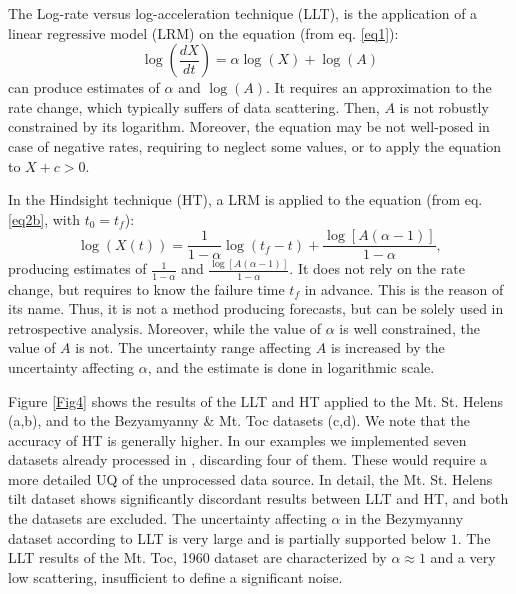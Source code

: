 \documentclass{article}
\begin{document}
The Log-rate versus log-acceleration technique (LLT), is the application of a linear regressive model (LRM) on the equation (from eq. \ref{eq1}):
$$\log\left(\frac{dX}{dt}\right)=\alpha\log(X)+\log(A)$$
can produce estimates of $\alpha$ and $\log(A)$. It requires an approximation to the rate change, which typically suffers of data scattering. Then, $A$ is not robustly constrained by its logarithm. Moreover, the equation may be not well-posed in case of negative rates, requiring to neglect some values, or to apply the equation to $X+c > 0$.

In the Hindsight technique (HT), a LRM is applied to the equation (from eq. \ref{eq2b}, with $t_0=t_f$):
$$\log(X(t))=\frac{1}{1-\alpha}\log(t_f-t)+\frac{\log[A(\alpha-1)]}{1-\alpha},$$
producing estimates of $\frac{1}{1-\alpha}$ and $\frac{\log[A(\alpha-1)]}{1-\alpha}$. It does not rely on the rate change, but requires to know the failure time $t_f$ in advance. This is the reason of its name. Thus, it is not a method producing forecasts, but can be solely used in retrospective analysis. Moreover, while the value of $\alpha$ is well constrained, the value of $A$ is not. The uncertainty range affecting $A$ is increased by the uncertainty affecting $\alpha$, and the estimate is done in logarithmic scale.

Figure \ref{Fig4} shows the results of the LLT and HT applied to the Mt. St. Helens (a,b), and to the Bezyamyanny \& Mt. Toc datasets (c,d). We note that the accuracy of HT is generally higher. In our examples we implemented seven datasets already processed in \cite{Voight1988}, discarding four of them. These would require a more detailed UQ of the unprocessed data source. In detail, the Mt. St. Helens tilt dataset shows significantly discordant results between LLT and HT, and both the datasets are excluded. The uncertainty affecting $\alpha$ in the Bezymyanny dataset according to LLT is very large and is partially supported below $1$. The LLT results of the Mt. Toc, 1960 dataset are characterized by $\alpha\approx 1$ and a very low scattering, insufficient to define a significant noise.



\end{document}
